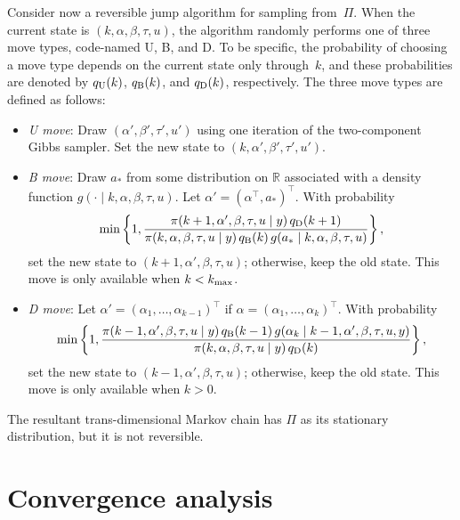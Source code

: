 \documentclass[12pt]{article}
\begin{document}
Consider now a reversible jump algorithm for sampling from~$\Pi$.
When the current state is $(k,\alpha, \beta, \tau, u)$, the algorithm randomly performs one of three move types, code-named U, B, and D.
To be specific, the probability of choosing a move type depends on the current state only through~$k$, and these probabilities are denoted by $q_{\scriptsize\mbox{U}}(k)$, $q_{\scriptsize\mbox{B}}(k)$, and $q_{\scriptsize\mbox{D}}(k)$, respectively.
The three move types are defined as follows:
\begin{itemize}
	\item {\it U move}: 
	Draw $(\alpha',\beta',\tau',u')$ using one iteration of the two-component Gibbs sampler.
	Set the new state to $(k,\alpha',\beta',\tau',u')$.
	
	\item {\it B move}: 
	Draw $a_*$ from some distribution on $\mathbb{R}$ associated with a density function $g(\cdot \mid k, \alpha, \beta, \tau, u)$.
	Let $\alpha' = (\alpha^{\top}, a_*)^{\top}$.
	With probability
	\[
	\min \left\{ 1, \frac{  \pi(k+1, \alpha', \beta, \tau, u \mid y) \, q_{\scriptsize\mbox{D}}(k+1) }{  \pi(k, \alpha, \beta, \tau, u \mid y) \, q_{\scriptsize\mbox{B}}(k) \, g(a_* \mid k, \alpha, \beta, \tau, u) } \right\},
	\]
	set the new state to $(k+1,\alpha',\beta,\tau,u)$;
	otherwise, keep the old state.
	This move is only available when $k < k_{\scriptsize \mbox{max}}$.
	\item {\it D move}: 
	Let $\alpha' = (\alpha_1, \dots, \alpha_{k-1})^{\top}$ if $\alpha = (\alpha_1, \dots, \alpha_k)^{\top}$.
	With probability
	\[
	\min \left\{ 1, \frac{  \pi(k - 1, \alpha', \beta, \tau, u \mid y) \, q_{\scriptsize\mbox{B}}(k-1) \, g(\alpha_k \mid k - 1, \alpha', \beta, \tau, u, y) }{  \pi(k, \alpha, \beta, \tau, u \mid y) \, q_{\scriptsize\mbox{D}}(k) } \right\},
	\]
	set the new state to $(k-1,\alpha', \beta, \tau, u)$;
	otherwise, keep the old state.
	This move is only available when $k > 0$.
\end{itemize}



{ The resultant trans-dimensional Markov chain has $\Pi$ as its stationary distribution, but it is not reversible.}






\section{Convergence analysis}
\end{document}
